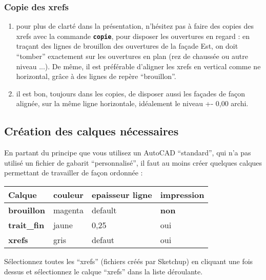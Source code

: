 \documentclass[a4paper,12pt,french]{sphinxmanual}
\begin{document}
\subsubsection{Copie des xrefs}
\label{init_su+acad/acad1:copie-des-xrefs}
\noindent{}
\begin{enumerate}
\item {} 
pour plus de clarté dans la présentation, n'hésitez pas à faire des copies des xrefs avec la commande \textbf{\texttt{copie}}, pour disposer les ouvertures en regard : en traçant des lignes de brouillon des ouvertures de la façade Est, on doit ``tomber'' exactement sur les ouvertures en plan (rez de chaussée ou autre niveau ...). De même, il est préférable d'aligner les xrefs en vertical comme ne horizontal, grâce à des lignes de repère ``brouillon''.

\item {} 
il est bon, toujours dans les copies, de disposer aussi les façades de façon alignée, sur la même ligne horizontale, idéalement le niveau +- 0,00 archi.

\end{enumerate}


\subsection{Création des calques nécessaires}
\label{init_su+acad/acad1:creation-des-calques-necessaires}
En partant du principe que vous utilisez un AutoCAD ``standard'', qui n'a pas utilisé un fichier de gabarit ``personnalisé'', il faut au moins créer quelques calques permettant de travailler de façon ordonnée :

\noindent\begin{tabulary}{\linewidth}{|L|L|L|L|}
\hline

\textbf{Calque}
&
\textbf{couleur}
&
\textbf{epaisseur ligne}
&
\textbf{impression}
\\
\hline
\textbf{brouillon}
&
magenta
&
default
&
\textbf{non}
\\
\hline
\textbf{trait\_fin}
&
jaune
&
0,25
&
oui
\\
\hline
\textbf{xrefs}
&
gris
&
defaut
&
oui
\\
\hline\end{tabulary}


Sélectionnez toutes les ``xrefs'' (fichiers  créés par Sketchup) en cliquant une fois dessus et sélectionnez le calque ``xrefs'' dans la liste déroulante.
\end{document}
